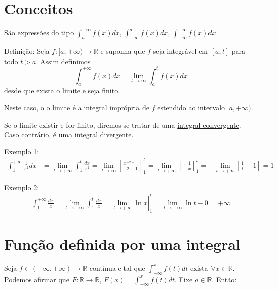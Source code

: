 \documentclass[12pt,openany, letterpaper]{book}
\newcommand{\LI}[1][n]{\lim_{{#1} \rightarrow \infty}}
\begin{document}
\section{Conceitos}
\label{sec:s11}

\hspace{5mm} São expressões do tipo $\displaystyle{\int_a^{+ \infty}f(x)dx}$, $\displaystyle{\int_{-\infty}^{a} f(x)dx}$, $\displaystyle{\int_{-\infty}^{+ \infty}f(x)dx}$\\
\vspace{15pt}

Definição: Seja $f:{[a,+\infty)}\rightarrow \mathds{R}$ e suponha que $f$ seja integrável em $[a,t]$ para todo $t>a$. Assim definimos $$ \int_a^{+\infty}f(x)dx = \lim_{t\rightarrow\infty}\int_a^t f(x)dx$$ desde que exista o limite e seja finito.

Neste caso, o o limite é a \underline{integral imprópria} de $f$ estendido ao intervalo $[a,+\infty)$.

Se o limite existir e for finito, diremos se tratar de uma \underline{integral convergente}. Caso contrário, é uma \underline{integral divergente}.

Exemplo 1:
\begin{align*}
\int_1^{+\infty}\frac{1}{x^2}dx &= \lim_{t\rightarrow + \infty}\int_1^t \frac{dx}{x^2}=\LI[t]\left[\frac{x^{-2+1}}{-2+1}\right]_1^t = \lim_{t\rightarrow + \infty}\left[-\frac{1}{x}\right]_1^t = -\lim_{t\rightarrow + \infty}\left[\frac{1}{t}-1\right]=1
\end{align*}

Exemplo 2:
\begin{align*}
\int_1^{+\infty}\frac{dx}{x}= \lim_{t\rightarrow + \infty}\int_1^t\frac{dx}{x}= \left.\lim_{t\rightarrow + \infty}\ln x \right|_1^t = \lim_{t\rightarrow + \infty}\ln t - 0 = +\infty
\end{align*}

\section{Função definida por uma integral}
\label{sec:s12}

\hspace{5mm} Seja $f \in (-\infty, +\infty) \rightarrow \mathds{R}$ contínua e tal que $\displaystyle{\int_{-\infty}^x f(t)dt}$ exista $\displaystyle{\forall x \in \mathds{R}}$. Podemos afirmar que $F:\mathds{R}\rightarrow\mathds{R}$, $\displaystyle{F(x)=\int_{-\infty}^x f(t)dt}$. Fixe $a \in \mathds{R}$. Então:
\end{document}
